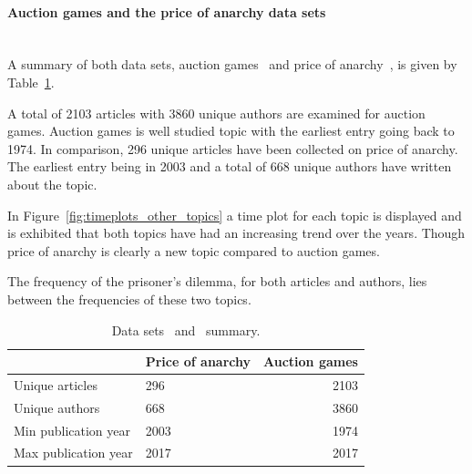 \documentclass{article}
\begin{document}
\paragraph{Auction games and the price of anarchy data sets}
\mbox{ }\\

A summary of both data sets, auction games~\cite{} and price of anarchy~\cite{},
is given by Table~\ref{table:summary_other_topics}.

A total of 2103 articles with 3860 unique authors are examined for auction games.
Auction games is well studied topic with the earliest entry going
back to 1974. In comparison, 296 unique articles have been collected on price of
anarchy. The earliest entry being in 2003 and a total of 668 unique authors have
written about the topic.

In Figure~\ref{fig:timeplots_other_topics} a time plot for each topic is
displayed and is exhibited that both topics have had an increasing trend over
the years. Though price of anarchy is clearly a new topic compared to auction games.

The frequency of the prisoner's dilemma, for both articles and authors, lies
between the frequencies of these two topics.

\begin{table}[!hbtp]
    \begin{center}
    \begin{tabular}{llr}
        \toprule
         &            Price of anarchy &  Auction games \\
        \midrule
        Unique articles      & 296  & 2103 \\
        Unique authors       & 668  & 3860 \\
        Min publication year & 2003 & 1974 \\
        Max publication year & 2017 & 2017 \\
        \bottomrule
    \end{tabular}
    \end{center}
    \caption{Data sets~\cite{} and~\cite{} summary.}
    \label{table:summary_other_topics}
\end{table}
\end{document}
